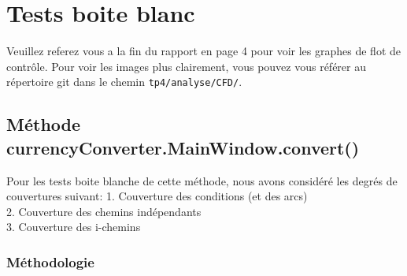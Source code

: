 \documentclass[11pt]{article}
\begin{document}
\section{Tests boite blanc}

Veuillez referez vous a la fin du rapport en page 4 pour voir les graphes de flot de contrôle. Pour voir les images plus clairement, vous pouvez vous référer au répertoire git dans le chemin \texttt{tp4/analyse/CFD/}.


\subsection{\textbf{Méthode currencyConverter.MainWindow.convert()}}
Pour les tests boite blanche de cette méthode, nous avons considéré les degrés de couvertures suivant:
1. Couverture des conditions (et des arcs) \\
2. Couverture des chemins indépendants \\
3. Couverture des i-chemins\\

\subsubsection{Méthodologie}



\end{document}
